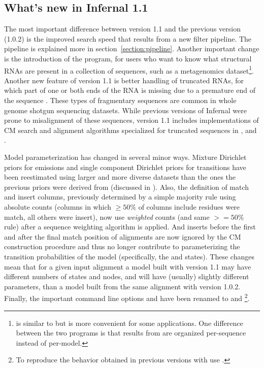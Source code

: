 \subsection{What's new in Infernal 1.1}

The most important difference between version 1.1 and the previous
version (1.0.2) is the improved search speed that results from a new
filter pipeline. The pipeline is explained more in
section~\ref{section:pipeline}. Another important change is the
introduction of the  program, for users who want to know
what structural RNAs are present in a collection of sequences, such as
a metagenomics dataset\footnote{ is similar to
 but is more convenient for some applications. One
difference between the two programs is that results from 
are organized per-sequence instead of per-model.}. Another new feature
of version 1.1 is better handling of truncated RNAs, for which part of
one or both ends of the RNA is missing due to a premature end of the
sequence \citep{KolbeEddy09}. These types of fragmentary sequences are
common in whole genome shotgun sequencing datasets. While previous
versions of Infernal were prone to misalignment of these sequences,
version 1.1 includes implementations of CM search and alignment
algorithms specialized for truncated sequences \citep{KolbeEddy09} in
,  and .

Model parameterization has changed in several minor ways. Mixture
Dirichlet priors for emissions and single component Dirichlet priors
for transitions have been reestimated using larger and more diverse
datasets than the ones the previous priors were derived from
(discussed in \citep{NawrockiEddy07}). Also, the definition of match
and insert columns, previously determined by a simple majority rule
using absolute counts (columns in which $\geq 50\%$ of columns include
residues were match, all others were insert), now use \emph{weighted}
counts (and same $>=50\%$ rule) after a sequence weighting algorithm
is applied. And inserts before the first and after the final match
position of alignments are now ignored by the CM construction
procedure and thus no longer contribute to parameterizing the
transition probabilities of the model (specifically, the
 and  states). These changes mean
that for a given input alignment a model built with version 1.1 may
have different numbers of states and nodes, and will have (usually)
slightly different parameters, than a model built from the same
alignment with version 1.0.2.  Finally, the important 
command line options  and  have been
renamed to  and \footnote{To reproduce
the behavior obtained in previous versions with 
use .}.

